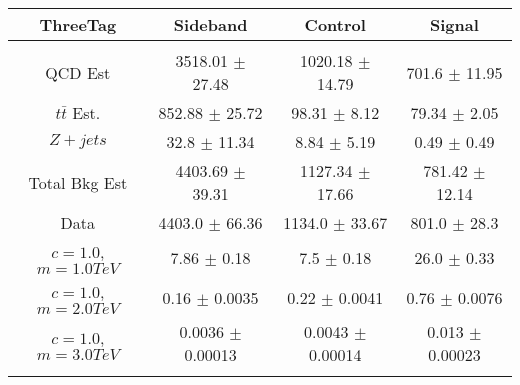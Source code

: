 \begin{footnotesize} 
\begin{tabular}{c|c|c|c} 
ThreeTag & Sideband & Control & Signal \\ 
\hline\hline 
& & & \\ 
QCD Est & 3518.01 $\pm$ 27.48 & 1020.18 $\pm$ 14.79 & 701.6 $\pm$ 11.95\\ 
$t\bar{t}$ Est.  & 852.88 $\pm$ 25.72 & 98.31 $\pm$ 8.12 & 79.34 $\pm$ 2.05\\ 
$Z+jets$ & 32.8 $\pm$ 11.34 & 8.84 $\pm$ 5.19 & 0.49 $\pm$ 0.49\\ 
Total Bkg Est & 4403.69 $\pm$ 39.31 & 1127.34 $\pm$ 17.66 & 781.42 $\pm$ 12.14\\ 
Data & 4403.0 $\pm$ 66.36 & 1134.0 $\pm$ 33.67 & 801.0 $\pm$ 28.3\\ 
$c=1.0$,$m=1.0TeV$ & 7.86 $\pm$ 0.18 & 7.5 $\pm$ 0.18 & 26.0 $\pm$ 0.33\\ 
$c=1.0$,$m=2.0TeV$ & 0.16 $\pm$ 0.0035 & 0.22 $\pm$ 0.0041 & 0.76 $\pm$ 0.0076\\ 
$c=1.0$,$m=3.0TeV$ & 0.0036 $\pm$ 0.00013 & 0.0043 $\pm$ 0.00014 & 0.013 $\pm$ 0.00023\\ 
& & & \\ 
\hline\hline 
\end{tabular} 
\end{footnotesize} 
\newline 
